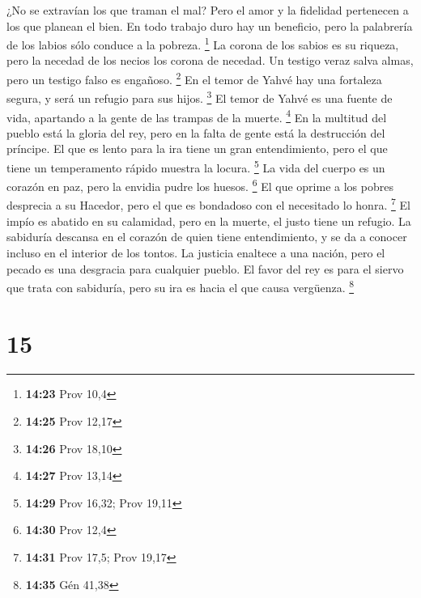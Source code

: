 ¿No se extravían los que traman el mal? Pero el amor y la fidelidad
pertenecen a los que planean el bien.  En todo trabajo
duro hay un beneficio, pero la palabrería de los labios sólo conduce a
la pobreza. \footnote{\textbf{14:23} Prov 10,4}  La
corona de los sabios es su riqueza, pero la necedad de los necios los
corona de necedad.  Un testigo veraz salva almas, pero un
testigo falso es engañoso. \footnote{\textbf{14:25} Prov 12,17}
 En el temor de Yahvé hay una fortaleza segura, y será un
refugio para sus hijos. \footnote{\textbf{14:26} Prov 18,10}
 El temor de Yahvé es una fuente de vida, apartando a la
gente de las trampas de la muerte. \footnote{\textbf{14:27} Prov 13,14}
 En la multitud del pueblo está la gloria del rey, pero
en la falta de gente está la destrucción del príncipe. 
El que es lento para la ira tiene un gran entendimiento, pero el que
tiene un temperamento rápido muestra la locura. \footnote{\textbf{14:29}
  Prov 16,32; Prov 19,11}  La vida del cuerpo es un
corazón en paz, pero la envidia pudre los huesos. \footnote{\textbf{14:30}
  Prov 12,4}  El que oprime a los pobres desprecia a su
Hacedor, pero el que es bondadoso con el necesitado lo honra.
\footnote{\textbf{14:31} Prov 17,5; Prov 19,17}  El impío
es abatido en su calamidad, pero en la muerte, el justo tiene un
refugio.  La sabiduría descansa en el corazón de quien
tiene entendimiento, y se da a conocer incluso en el interior de los
tontos.  La justicia enaltece a una nación, pero el
pecado es una desgracia para cualquier pueblo.  El favor
del rey es para el siervo que trata con sabiduría, pero su ira es hacia
el que causa vergüenza. \footnote{\textbf{14:35} Gén 41,38}

\hypertarget{section-14}{%
\section{15}\label{section-14}}

